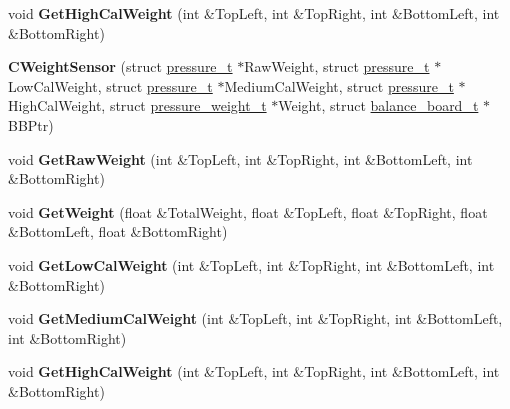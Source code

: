 \begin{DoxyCompactItemize}
\item 
\hypertarget{class_c_weight_sensor_a554e7bb937f52a77bdc47f5048ef6c0a}{void {\bfseries Get\-High\-Cal\-Weight} (int \&Top\-Left, int \&Top\-Right, int \&Bottom\-Left, int \&Bottom\-Right)}\label{class_c_weight_sensor_a554e7bb937f52a77bdc47f5048ef6c0a}

\item 
\hypertarget{class_c_weight_sensor_a04fea64b48194689bf78171e51e97b2d}{{\bfseries C\-Weight\-Sensor} (struct \hyperlink{structpressure__t}{pressure\-\_\-t} $\ast$Raw\-Weight, struct \hyperlink{structpressure__t}{pressure\-\_\-t} $\ast$Low\-Cal\-Weight, struct \hyperlink{structpressure__t}{pressure\-\_\-t} $\ast$Medium\-Cal\-Weight, struct \hyperlink{structpressure__t}{pressure\-\_\-t} $\ast$High\-Cal\-Weight, struct \hyperlink{structpressure__weight__t}{pressure\-\_\-weight\-\_\-t} $\ast$Weight, struct \hyperlink{structbalance__board__t}{balance\-\_\-board\-\_\-t} $\ast$B\-B\-Ptr)}\label{class_c_weight_sensor_a04fea64b48194689bf78171e51e97b2d}

\item 
\hypertarget{class_c_weight_sensor_a3afa84d9e73a9d4d86462661549b3114}{void {\bfseries Get\-Raw\-Weight} (int \&Top\-Left, int \&Top\-Right, int \&Bottom\-Left, int \&Bottom\-Right)}\label{class_c_weight_sensor_a3afa84d9e73a9d4d86462661549b3114}

\item 
\hypertarget{class_c_weight_sensor_a8c7a1bc975f98685aaad423a1e26cffd}{void {\bfseries Get\-Weight} (float \&Total\-Weight, float \&Top\-Left, float \&Top\-Right, float \&Bottom\-Left, float \&Bottom\-Right)}\label{class_c_weight_sensor_a8c7a1bc975f98685aaad423a1e26cffd}

\item 
\hypertarget{class_c_weight_sensor_a6cf2534f75d4f3dd629d49958f0ba7ee}{void {\bfseries Get\-Low\-Cal\-Weight} (int \&Top\-Left, int \&Top\-Right, int \&Bottom\-Left, int \&Bottom\-Right)}\label{class_c_weight_sensor_a6cf2534f75d4f3dd629d49958f0ba7ee}

\item 
\hypertarget{class_c_weight_sensor_a6d3ab9b23321846eb9bcf8401b02ba4e}{void {\bfseries Get\-Medium\-Cal\-Weight} (int \&Top\-Left, int \&Top\-Right, int \&Bottom\-Left, int \&Bottom\-Right)}\label{class_c_weight_sensor_a6d3ab9b23321846eb9bcf8401b02ba4e}

\item 
\hypertarget{class_c_weight_sensor_a554e7bb937f52a77bdc47f5048ef6c0a}{void {\bfseries Get\-High\-Cal\-Weight} (int \&Top\-Left, int \&Top\-Right, int \&Bottom\-Left, int \&Bottom\-Right)}\label{class_c_weight_sensor_a554e7bb937f52a77bdc47f5048ef6c0a}

\end{DoxyCompactItemize}
